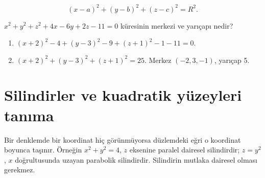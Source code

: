 {\small\[
(x-a)^2+(y-b)^2+(z-c)^2=R^2.
\]}
\begin{tcolorbox}[title={Örnek 2.10 | Dersteki küre sorusu},colframe=accent]\(x^2+y^2+z^2+4x-6y+2z-11=0\) küresinin merkezi ve yarıçapı nedir?
\par{}\end{tcolorbox}
\begin{tcolorbox}[title={Adım adım çözüm},colback=green!3!white,colframe=green]\begin{enumerate}
\item \((x+2)^2-4+(y-3)^2-9+(z+1)^2-1-11=0\).
\item \((x+2)^2+(y-3)^2+(z+1)^2=25\). Merkez \((-2,3,-1)\), yarıçap 5.
\end{enumerate}\end{tcolorbox}
\section{Silindirler ve kuadratik yüzeyleri tanıma}
Bir denklemde bir koordinat hiç görünmüyorsa düzlemdeki eğri o koordinat boyunca taşınır. Örneğin \(x^2+y^2=4\), \(z\) eksenine paralel dairesel silindirdir; \(z=y^2\), \(x\) doğrultusunda uzayan parabolik silindirdir. Silindirin mutlaka dairesel olması gerekmez.

